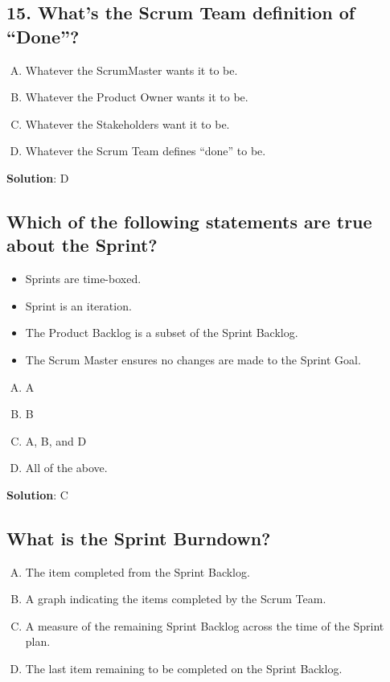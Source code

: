 \subsection{15. What's the Scrum Team definition of \enquote{Done}?}

\begin{enumerate}[A)]
  \item Whatever the ScrumMaster wants it to be.
  \item Whatever the Product Owner wants it to be.
  \item Whatever the Stakeholders want it to be.
  \item Whatever the Scrum Team defines \enquote{done} to be.
\end{enumerate}


\textbf{Solution}: D


\subsection{Which of the following statements are true about the Sprint?}
\begin{itemize}
  \item Sprints are time-boxed.
  \item Sprint is an iteration.
  \item The Product Backlog is a subset of the Sprint Backlog.
  \item The Scrum Master ensures no changes are made to the Sprint Goal.
\end{itemize}

\begin{enumerate}[A)]
  \item A
  \item B
  \item A, B, and D
  \item All of the above.
\end{enumerate}


\textbf{Solution}: C


\subsection{What is the Sprint Burndown?}
\begin{enumerate}[A)]
  \item The item completed from the Sprint Backlog.
  \item A graph indicating the items completed by the Scrum Team.
  \item A measure of the remaining Sprint Backlog across the time of the Sprint plan.
  \item The last item remaining to be completed on the Sprint Backlog.
\end{enumerate}


